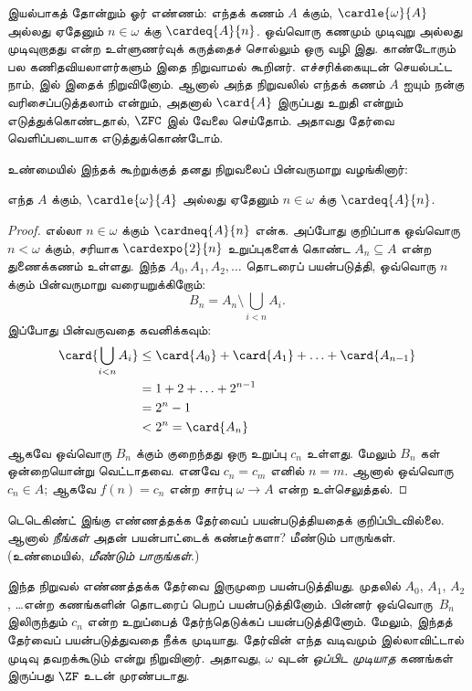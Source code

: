 \documentclass[../../../include/open-logic-section]{subfiles}
\begin{document}
\begin{ex}
இயல்பாகத் தோன்றும் ஓர் எண்ணம்: எந்தக் கணம் $A$ க்கும்,
$\cardle{\omega}{A}$ அல்லது ஏதேனும் $n \in \omega$
க்கு $\cardeq{A}{n}$. ஒவ்வொரு கணமும் முடிவுறு அல்லது
முடிவுறாதது என்ற உள்ளுணர்வுக் கருத்தைச் சொல்லும் ஒரு வழி
இது. காண்டோரும் பல கணிதவியலாளர்களும் இதை நிறுவாமல்
கூறினர். எச்சரிக்கையுடன் செயல்பட்ட நாம்,
 இல்
இதைக் நிறுவினோம். ஆனால் அந்த நிறுவலில் எந்தக் கணம்
$A$ ஐயும் நன்கு வரிசைப்படுத்தலாம் என்றும், அதனால்
$\card{A}$ இருப்பது உறுதி என்றும் எடுத்துக்கொண்டதால்,
$\ZFC$ இல் வேலை செய்தோம். அதாவது தேர்வை வெளிப்படையாக
எடுத்துக்கொண்டோம்.

உண்மையில் \citet{Dedekind1888} இந்தக் கூற்றுக்குத்
தனது நிறுவலைப் பின்வருமாறு வழங்கினார்:

\begin{thm}
எந்த $A$ க்கும், $\cardle{\omega}{A}$ அல்லது ஏதேனும்
$n \in \omega$ க்கு $\cardeq{A}{n}$.
\end{thm}

\begin{proof}
எல்லா $n \in \omega$ க்கும் $\cardneq{A}{n}$ என்க.
அப்போது குறிப்பாக ஒவ்வொரு $n < \omega$ க்கும்,
சரியாக $\cardexpo{2}{n}$ உறுப்புகளைக் கொண்ட
$A_n \subseteq A$ என்ற துணைக்கணம் உள்ளது.
இந்த $A_0, A_1, A_2, \ldots$ தொடரைப் பயன்படுத்தி,
ஒவ்வொரு $n$ க்கும் பின்வருமாறு வரையறுக்கிறோம்:
\[
	B_n = A_n \setminus \bigcup_{i < n} A_i.
\]
இப்போது பின்வருவதை கவனிக்கவும்:
\begin{align*}
	\card{\bigcup_{i < n}A_i}
	&\leq \card{A_0} + \card{A_1} + \ldots + \card{A_{n-1}}\\
	&=1 + 2 + \ldots + 2^{n-1}\\
	& = 2^n - 1\\
	& < 2^n = \card{A_n}
\end{align*}
ஆகவே ஒவ்வொரு $B_n$ க்கும் குறைந்தது ஒரு உறுப்பு $c_n$
உள்ளது. மேலும் $B_n$ கள் ஒன்றையொன்று வெட்டாதவை.
எனவே $c_n = c_m$ எனில் $n = m$. ஆனால் ஒவ்வொரு
$c_n \in A$; ஆகவே $f(n) = c_n$ என்ற சார்பு
$\omega \to A$ என்ற உள்செலுத்தல்.
\end{proof}
\noindent

டெடெகிண்ட் இங்கு எண்ணத்தக்க தேர்வைப் பயன்படுத்தியதைக்
குறிப்பிடவில்லை. ஆனால் \emph{நீங்கள்} அதன் பயன்பாட்டைக்
கண்டீர்களா? மீண்டும் பாருங்கள். (உண்மையில்,
\emph{மீண்டும் பாருங்கள்}.)

இந்த நிறுவல் எண்ணத்தக்க தேர்வை இருமுறை பயன்படுத்தியது.
முதலில் $A_0$, $A_1$, $A_2$, \dots\@ என்ற கணங்களின்
தொடரைப் பெறப் பயன்படுத்தினோம். பின்னர் ஒவ்வொரு~$B_n$
இலிருந்தும் $c_n$ என்ற உறுப்பைத் தேர்ந்தெடுக்கப்
பயன்படுத்தினோம். மேலும், இந்தத் தேர்வைப் பயன்படுத்துவதை
நீக்க முடியாது. தேர்வின் எந்த வடிவமும் இல்லாவிட்டால்
முடிவு தவறக்கூடும் என்று \citet[p.~138]{Cohen1966}
நிறுவினார். அதாவது, $\omega$ வுடன் \emph{ஒப்பிட முடியாத}
கணங்கள் இருப்பது $\ZF$ உடன் முரண்படாது.
\end{ex}
\end{document}
